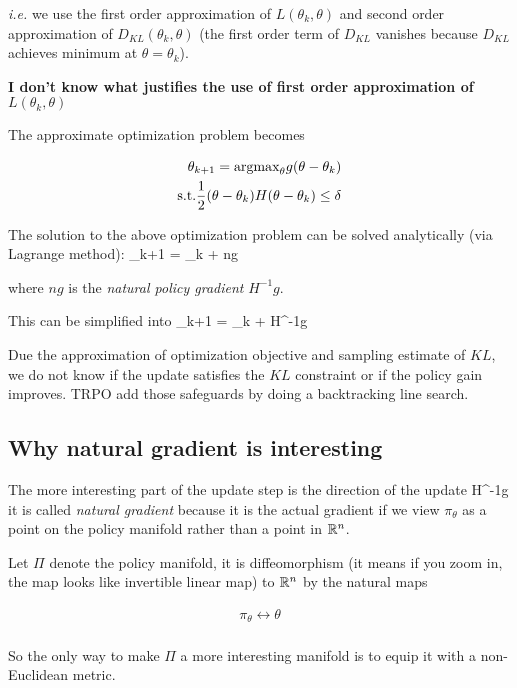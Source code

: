 \documentclass{article}
\let\[\relax \let\]\relax %
\DeclareRobustCommand{\[}{\begin{equation}}
\DeclareRobustCommand{\]}{\end{equation}}
\begin{document}
\emph{i.e.} we use the first order approximation of $L(\theta_k, \theta)$
and second order approximation of $D_{KL}(\theta_k, \theta)$ (the first 
order term of $D_{KL}$ vanishes because $D_{KL}$ achieves minimum at $\theta = \theta_k$). 

\textbf{I don't know what justifies the use of first order approximation of $L(\theta_k, \theta)$}

The approximate optimization problem becomes

\begin{align}
\theta_{k+1} = \text{argmax}_{\theta}g(\theta - \theta_k) \\
\text{s.t.} \frac{1}{2}(\theta - \theta_k)H(\theta - \theta_k)\le \delta
\end{align}

The solution to the above optimization problem can be solved analytically (via Lagrange method):
\[
\theta_{k+1} = \theta_k +  ng
\]

where $ng$ is the \emph{natural policy gradient} $H^{-1}g$. 

This can be simplified into
\[
\theta_{k+1} = \theta_k +  H^{-1}g
\]

Due the approximation of optimization objective and sampling estimate of
$KL$, we do not know if the update satisfies the $KL$ constraint or if the 
policy gain improves. TRPO add those safeguards by doing a backtracking line
search. 

\subsection{Why natural gradient is interesting}
The more interesting part of the update step is the direction of the update
\[
    H^{-1}g
\]
it is called \emph{natural gradient} because it is the actual gradient if we
view $\pi_{\theta}$ as a point on the policy manifold rather than a point in 
$\mathbb{R}^n$. 

Let $\Pi$ denote the policy manifold, it is diffeomorphism (it means if you 
zoom in, the map looks like invertible linear map) to $\mathbb{R}^n$ by 
the natural maps

\begin{align*}
\pi_{\theta} \leftrightarrow \theta \\
\end{align*}

So the only way to make $\Pi$ a more interesting manifold is to equip it with
a non-Euclidean metric.
\end{document}
